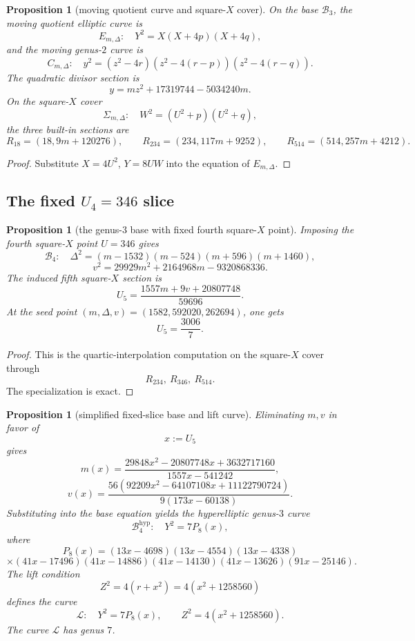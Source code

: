 \documentclass[11pt]{article}
\theoremstyle{plainbreak}
\newtheorem{proposition}[theorem]{Proposition}
\theoremstyle{defbreak}
\begin{document}
\begin{proposition}[moving quotient curve and square-$X$ cover]
On the base $\mathcal B_3$, the moving quotient elliptic curve is
\[
E_{m,\Delta}:\quad Y^2=X(X+4p)(X+4q),
\]
and the moving genus-$2$ curve is
\[
C_{m,\Delta}:\quad
y^2=(z^2-4r)(z^2-4(r-p))(z^2-4(r-q)).
\]
The quadratic divisor section is
\[
y=mz^2+17319744-5034240m.
\]
On the square-$X$ cover
\[
\Sigma_{m,\Delta}:\quad W^2=(U^2+p)(U^2+q),
\]
the three built-in sections are
\[
R_{18}=(18,9m+120276),\qquad
R_{234}=(234,117m+9252),\qquad
R_{514}=(514,257m+4212).
\]
\end{proposition}

\begin{proof}
Substitute $X=4U^2$, $Y=8UW$ into the equation of $E_{m,\Delta}$.
\end{proof}

\subsection{The fixed $U_4=346$ slice}

\begin{proposition}[the genus-$3$ base with fixed fourth square-$X$ point]
Imposing the fourth square-$X$ point $U=346$ gives
\[
\mathcal B_4:\quad
\Delta^2=(m-1532)(m-524)(m+596)(m+1460),
\]
\[
v^2=29929m^2+2164968m-9320868336.
\]
The induced fifth square-$X$ section is
\[
U_5=\frac{1557m+9v+20807748}{59696}.
\]
At the seed point $(m,\Delta,v)=(1582,592020,262694)$, one gets
\[
U_5=\frac{3006}{7}.
\]
\end{proposition}

\begin{proof}
This is the quartic-interpolation computation on the square-$X$ cover through
\[
R_{234},\ R_{346},\ R_{514}.
\]
The specialization is exact.
\end{proof}

\begin{proposition}[simplified fixed-slice base and lift curve]
Eliminating $m,v$ in favor of
\[
x:=U_5
\]
gives
\[
m(x)=\frac{29848x^2-20807748x+3632717160}{1557x-541242},
\]
\[
v(x)=\frac{56(92209x^2-64107108x+11122790724)}{9(173x-60138)}.
\]
Substituting into the base equation yields the hyperelliptic genus-$3$ curve
\[
\mathcal B_4^{\mathrm{hyp}}:\quad Y^2=7P_8(x),
\]
where
\[
P_8(x)=
(13x-4698)(13x-4554)(13x-4338)
\]
\[
\times
(41x-17496)(41x-14886)(41x-14130)(41x-13626)
(91x-25146).
\]
The lift condition
\[
Z^2=4(r+x^2)=4(x^2+1258560)
\]
defines the curve
\[
\mathcal L:\quad
Y^2=7P_8(x),\qquad Z^2=4(x^2+1258560).
\]
The curve $\mathcal L$ has genus $7$.
\end{proposition}
\end{document}
